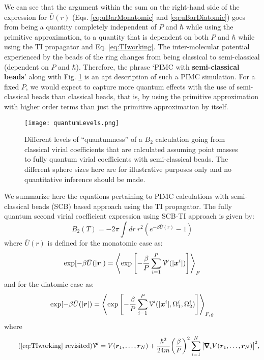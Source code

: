         We can see that the argument within the sum on the right-hand side of the expression for $\bar{U} (r)$ (Eqs. \eqref{eq:uBarMonatomic} and \eqref{eq:uBarDiatomic}) goes from being a quantity completely independent of $P$ and $\hbar$ while using the primitive approximation, to a quantity that is dependent on both $P$ and $\hbar$ while using the TI propagator and Eq. \eqref{eq:TIworking}. The inter-molecular potential experienced by the beads of the ring changes from being classical to semi-classical (dependent on $P$ and $\hbar$). Therefore, the phrase `PIMC with \textbf{semi-classical beads}' along with Fig. \ref{quantumness} is an apt description of such a PIMC simulation. For a fixed $P$, we would expect to capture more quantum effects with the use of semi-classical beads than classical beads, that is, by using the primitive approximation with higher order terms than just the primitive approximation by itself.
        \begin{figure}
            \centering
            \texttt{[image: quantumLevels.png]}
            \caption{Different levels of ``quantumness'' of a $B_2$ calculation going from classical virial coefficients that are calculated assuming point masses to fully quantum virial coefficients with semi-classical beads. The different sphere sizes here are for illustrative purposes only and no quantitative inference should be made.} \label{quantumness}
        \end{figure}

        We summarize here the equations pertaining to PIMC calculations with semi-classical beads (SCB) based approach using the TI propagator.
        The fully quantum second virial coefficient expression using SCB-TI approach is given by:
        \begin{equation}
        \label{eq:b2SCBTI}
            B_2 (T) = -2 \pi \displaystyle\int dr~ r^2 (e^{-\beta \bar{U} (r)} - 1)
        \end{equation}
        where $\bar {U} (r)$ is defined for the monatomic case as:
        \begin{equation}
            \label{eq:uBarMonatomicSCBTI}
            \exp [-\beta \bar{U} (|{\boldsymbol {r}}|) = \left< \exp \left[ -\displaystyle\frac{\beta}{P} \sum_{i=1}^P \mathcal{V'} (|{\boldsymbol {x}}^i|) \right] \right>_F
        \end{equation}
        and for the diatomic case as:
        \begin{equation}
            \label{eq:uBarDiatomicSCBTI}
            \exp [-\beta \bar{U} (|{\boldsymbol {r}}|) = \left< \exp \left[ -\displaystyle\frac{\beta}{P} \sum_{i=1}^P \mathcal{V'} (|{\boldsymbol {x}}^i|,\Omega_1^i,\Omega_2^i) \right] \right>_{F,\varrho}
        \end{equation}
        where
        \begin{equation}
        \tag{\eqref{eq:TIworking} revisited}
            \mc{V'} = V (\bm{r}_1, \ldots ,\bm{r}_N) + \frac{\hbar^2}{24m} \bigg(\frac{\beta}{P} \bigg)^2 \displaystyle\sum\limits_{i=1}^N \big|\pmb{\nabla}_i V (\bm{r}_1, \ldots ,\bm{r}_N) \big|^2,
        \end{equation}

